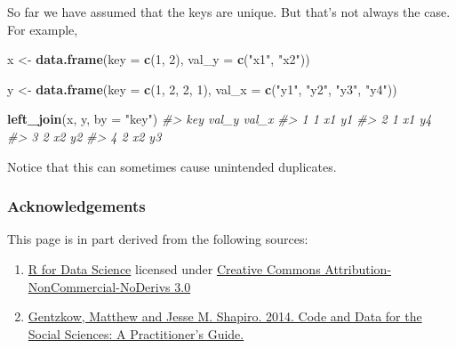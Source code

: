 \documentclass[]{book}
\newenvironment{Shaded}{\begin{snugshade}}{\end{snugshade}}
\newcommand{\KeywordTok}[1]{\textcolor[rgb]{0.13,0.29,0.53}{\textbf{#1}}}
\newcommand{\DataTypeTok}[1]{\textcolor[rgb]{0.13,0.29,0.53}{#1}}
\newcommand{\DecValTok}[1]{\textcolor[rgb]{0.00,0.00,0.81}{#1}}
\newcommand{\StringTok}[1]{\textcolor[rgb]{0.31,0.60,0.02}{#1}}
\newcommand{\CommentTok}[1]{\textcolor[rgb]{0.56,0.35,0.01}{\textit{#1}}}
\newcommand{\NormalTok}[1]{#1}
\begin{document}
So far we have assumed that the keys are unique. But that's not always
the case. For example,

\begin{Shaded}
\begin{Highlighting}[]
\NormalTok{x <-}\StringTok{ }\KeywordTok{data.frame}\NormalTok{(}\DataTypeTok{key =} \KeywordTok{c}\NormalTok{(}\DecValTok{1}\NormalTok{, }\DecValTok{2}\NormalTok{),}
               \DataTypeTok{val_y =} \KeywordTok{c}\NormalTok{(}\StringTok{"x1"}\NormalTok{, }\StringTok{"x2"}\NormalTok{))}

\NormalTok{y <-}\StringTok{ }\KeywordTok{data.frame}\NormalTok{(}\DataTypeTok{key =} \KeywordTok{c}\NormalTok{(}\DecValTok{1}\NormalTok{, }\DecValTok{2}\NormalTok{, }\DecValTok{2}\NormalTok{, }\DecValTok{1}\NormalTok{),}
               \DataTypeTok{val_x =} \KeywordTok{c}\NormalTok{(}\StringTok{"y1"}\NormalTok{, }\StringTok{"y2"}\NormalTok{, }\StringTok{"y3"}\NormalTok{, }\StringTok{"y4"}\NormalTok{))}

\KeywordTok{left_join}\NormalTok{(x, y, }\DataTypeTok{by =} \StringTok{"key"}\NormalTok{)}
\CommentTok{#>   key val_y val_x}
\CommentTok{#> 1   1    x1    y1}
\CommentTok{#> 2   1    x1    y4}
\CommentTok{#> 3   2    x2    y2}
\CommentTok{#> 4   2    x2    y3}
\end{Highlighting}
\end{Shaded}

Notice that this can sometimes cause unintended duplicates.

\subsubsection*{Acknowledgements}\label{acknowledgements-2}

This page is in part derived from the following sources:

\begin{enumerate}
\def\labelenumi{\arabic{enumi}.}
\item
  \href{https://r4ds.had.co.nz}{R for Data Science} licensed under
  \href{https://creativecommons.org/licenses/by-nc-nd/3.0/us/}{Creative
  Commons Attribution-NonCommercial-NoDerivs 3.0}
\item
  \href{https://web.stanford.edu/~gentzkow/research/CodeAndData.pdf}{Gentzkow,
  Matthew and Jesse M. Shapiro. 2014. Code and Data for the Social
  Sciences: A Practitioner's Guide.}
\end{enumerate}
\end{document}
